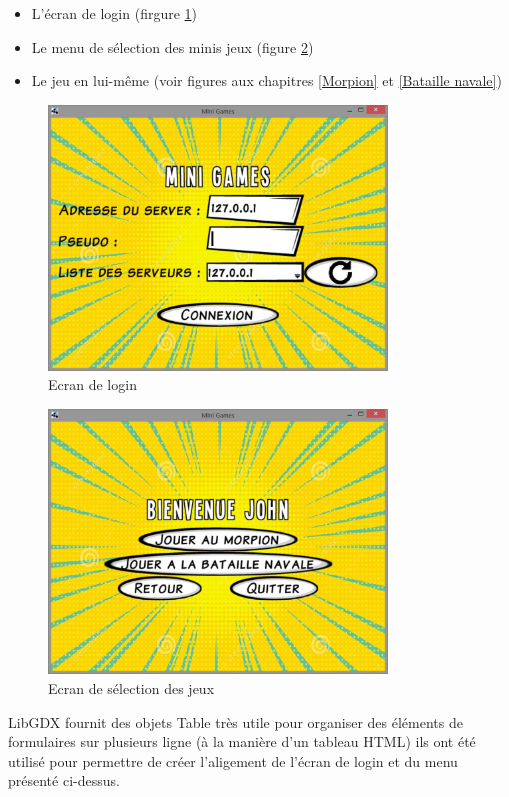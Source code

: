 \documentclass{report}
\begin{document}
\begin{itemize}
  \item L'écran de login (firgure \ref{Ecran de login})
  \item Le menu de sélection des minis jeux (figure \ref{Ecran de selection})
  \item Le jeu en lui-même (voir figures aux chapitres \ref{Morpion} et \ref{Bataille navale})
\end{itemize}

\begin{figure}[H]
	\centering\includegraphics[width=9cm]{loginScreen}
	\caption{Ecran de login}
	\label{Ecran de login}
\end{figure}

\begin{figure}[H]
	\centering\includegraphics[width=9cm]{menuJeux}
	\caption{Ecran de sélection des jeux}
	\label{Ecran de selection}
\end{figure}

LibGDX fournit des objets Table très utile pour organiser des éléments de formulaires sur plusieurs ligne
(à la manière d'un tableau HTML) ils ont été utilisé pour permettre de créer l'aligement de l'écran de login et du menu
présenté ci-dessus.
\end{document}
